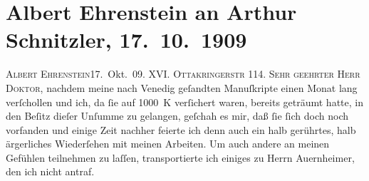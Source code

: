 

         
         \renewcommand{\erwaehntePersonen}{Personen: Raoul Auernheimer, Franz Blei, Gustav Meyrink}
         \renewcommand{\erwaehnteInstitutionen}{Institutionen: Der Spiegel. Münchner Halbmonatsschrift, Hyperion, Neue Freie Presse, Neue Rundschau, Neue Deutsche Rundschau, Freie Bühne}
         \renewcommand{\erwaehnteOrte}{Orte: Neulinggasse, Ottakringerstraße, Venedig, Wien}
         \renewcommand{\erwaehnteWerke}{Werke: Apaturien, Die Lage in Ungarn (Siebenbürgen und Serbien ausgenommen) im Jahre 1790, Tod des Zehir eddin Muhammed Baber}
               \section[Albert Ehrenstein an Arthur Schnitzler, 17. 10. 1909]{ Albert Ehrenstein an Arthur Schnitzler, 17. 10. 1909}\nopagebreak{}\rehead{ }\begin{ledgroupsized}[t]{13cm}\normalsize\beginnumbering \toendnotes[C]{\smallbreak\pagebreak[2]} 
\toendnotes[C]{\smallbreak}\pstart
           {\pb}\textsc{Albert Ehrenstein}\hfill 17. Okt. 09. \pend
           \pstart
           \textsc{XVI. Ottakringerstr} 114.\pend
           \pstart{}\textsc{Sehr geehrter Herr Doktor,}\pend\pstart
           nachdem meine nach Venedig geſandten Manuſkripte
                    einen Monat lang verſchollen und ich, da ſie auf 1000 K verſichert waren,
                    bereits geträumt hatte, in den Beſitz dieſer Unſumme zu gelangen, geſchah es
                    mir, daß ſie ſich doch noch vorfanden und einige Zeit nachher feierte ich denn
                    auch ein halb gerührtes, halb ärgerliches Wiederſehen mit meinen Arbeiten. Um
                    auch andere an meinen Gefühlen teilnehmen zu laſſen, transportierte ich einiges
                    zu Herrn Auernheimer, den ich nicht antraf.

\end{ledgroupsized}
